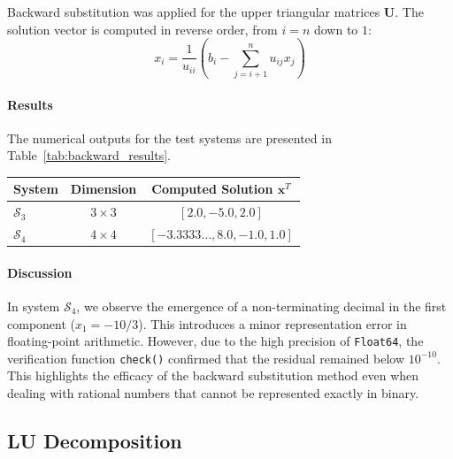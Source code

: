\begin{solution}
    Backward substitution was applied for the upper triangular matrices $\mathbf{U}$. The solution vector is computed in reverse order, from $i = n$ down to $1$:
    \[ 
      x_i = \frac{1}{u_{ii}} \left( b_i - \sum_{j=i+1}^{n} u_{ij} x_j \right) 
    \]
    
    \paragraph{Results}
    The numerical outputs for the test systems are presented in Table~\ref{tab:backward_results}.
    \begin{center}
        \centering
        \label{tab:backward_results}
        \begin{tabular}{lcc}
            \hline
            System & Dimension & Computed Solution $\mathbf{x}^T$ \\
            \hline
            $\mathcal{S}_3$ & $3 \times 3$ & $[2.0, -5.0, 2.0]$ \\
            $\mathcal{S}_4$ & $4 \times 4$ & $[-3.3333\dots, 8.0, -1.0, 1.0]$ \\
            \hline
        \end{tabular}
    \end{center}

    \paragraph{Discussion}
    In system $\mathcal{S}_4$, we observe the emergence of a non-terminating decimal in the first component ($x_1 = -10/3$). This introduces a minor representation error in floating-point arithmetic. However, due to the high precision of \texttt{Float64}, the verification function \texttt{check()} confirmed that the residual remained below $10^{-10}$. This highlights the efficacy of the backward substitution method even when dealing with rational numbers that cannot be represented exactly in binary.
\end{solution}

\subsection{LU Decomposition}

